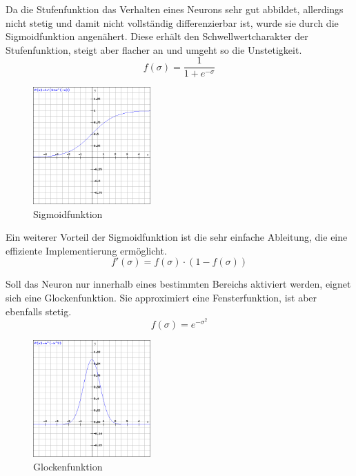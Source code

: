 Da die Stufenfunktion das Verhalten eines Neurons sehr gut abbildet, allerdings nicht stetig und damit nicht vollständig differenzierbar ist, wurde sie durch die Sigmoidfunktion angenähert. Diese erhält den Schwellwertcharakter der Stufenfunktion, steigt aber flacher an und umgeht so die Unstetigkeit.
\begin{equation}
f(\sigma) = \frac{1}{1+e^{-\sigma}}
\end{equation}
\begin{figure}[h]
\centering
\includegraphics[width=0.4\textwidth]{pictures/sigmoid.png}
\caption{Sigmoidfunktion}

\end{figure}

Ein weiterer Vorteil der Sigmoidfunktion ist die sehr einfache Ableitung, die eine effiziente Implementierung ermöglicht.
\begin{equation}
f'(\sigma) = f(\sigma)\cdot (1- f(\sigma))
\end{equation}

Soll das Neuron nur innerhalb eines bestimmten Bereichs aktiviert werden, eignet sich eine Glockenfunktion. Sie approximiert eine Fensterfunktion, ist aber ebenfalls stetig.
\begin{equation}
f(\sigma) = e^{-\sigma^2}
\end{equation}
\begin{figure}[h]
\centering
\includegraphics[width=0.4\textwidth]{pictures/glocke.png}
\caption{Glockenfunktion}

\end{figure}




